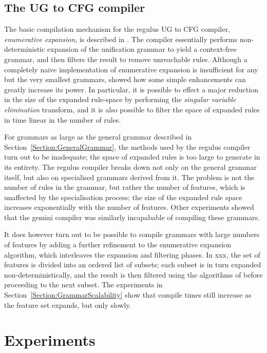 \documentclass[11pt]{article}
\begin{document}
\subsection{The UG to CFG compiler}
\label{Section:UGToCFG}

The basic compilation mechanism for the {\sc regulus} UG to CFG
compiler, {\em enumerative expansion}, is described in
\cite{RaynerDowdingHockey2001}. The compiler essentially performs
non-deterministic expansion of the unification grammar to yield a
context-free grammar, and then filters the result to remove
unreachable rules. Although a completely naive implementation of
enumerative expansion is insufficient for any but the very smallest grammars,
\cite{RaynerDowdingHockey2001} showed how some simple
enhancements can greatly increase its power. In particular, it is
possible to effect a major reduction in the size of the expanded
rule-space by performing the {\em singular variable elimination}
transform, and it is also possible to filter the space of expanded
rules in time linear in the number of rules. 

For grammars as large as the general grammar described in
Section~\ref{Section:GeneralGrammar}, the methods used by the {\sc
regulus} compiler turn out to be inadequate; the space of expanded
rules is too large to generate in its entirety.  The {\sc regulus}
compiler breaks down not only on the general grammar itself, but also
on specialised grammars derived from it. The problem is not the number
of rules in the grammar, but rather the number of features, which is
unaffected by the specialisation process; the size of the expanded
rule space increases exponentially with the number of features. Other
experiments showed that the {\sc gemini} compiler \cite{Moore1998} was
similarly incapabable of compiling these grammars.

It does however turn out to be possible to compile grammars with large
numbers of features by adding a further refinement to the enumerative
expansion algorithm, which interleaves the expansion and filtering
phases. In {\sc xxx}, the set of features is divided into an
ordered list of subsets; each subset is in turn expanded
non-deterministically, and the result is then filtered using the
algorithms of \cite{RaynerDowdingHockey2001} before proceeding to the
next subset. The experiments in Section~\ref{Section:GrammarScalability}
show that compile times still increase as the feature set expands,
but only slowly.  

\section{Experiments}
\label{Section:Experiments}
\end{document}
